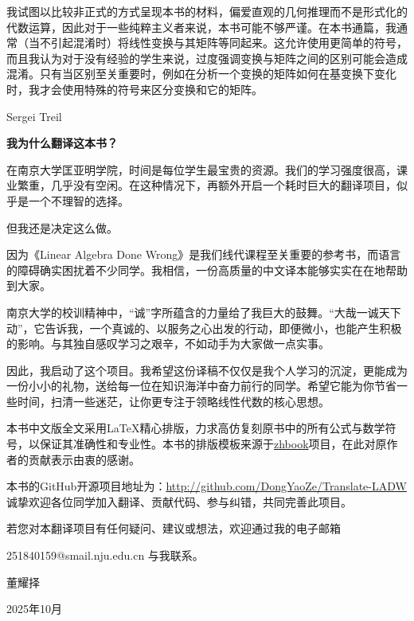 \begin{preface}
我试图以比较非正式的方式呈现本书的材料，偏爱直观的几何推理而不是形式化的代数运算，因此对于一些纯粹主义者来说，本书可能不够严谨。在本书通篇，我通常（当不引起混淆时）将线性变换与其矩阵等同起来。这允许使用更简单的符号，而且我认为对于没有经验的学生来说，过度强调变换与矩阵之间的区别可能会造成混淆。只有当区别至关重要时，例如在分析一个变换的矩阵如何在基变换下变化时，我才会使用特殊的符号来区分变换和它的矩阵。
\vspace{5ex}
\begin{flushright}
Sergei Treil~~~~~~~~~
\end{flushright}





\end{preface}

\begin{preface}[译者的话]

\textbf{我为什么翻译这本书？}

在南京大学匡亚明学院，时间是每位学生最宝贵的资源。我们的学习强度很高，课业繁重，几乎没有空闲。在这种情况下，再额外开启一个耗时巨大的翻译项目，似乎是一个不理智的选择。

但我还是决定这么做。

因为《Linear Algebra Done Wrong》是我们线代课程至关重要的参考书，而语言的障碍确实困扰着不少同学。我相信，一份高质量的中文译本能够实实在在地帮助到大家。

南京大学的校训精神中，“诚”字所蕴含的力量给了我巨大的鼓舞。“大哉一诚天下动”，它告诉我，一个真诚的、以服务之心出发的行动，即便微小，也能产生积极的影响。与其独自感叹学习之艰辛，不如动手为大家做一点实事。

因此，我启动了这个项目。我希望这份译稿不仅仅是我个人学习的沉淀，更能成为一份小小的礼物，送给每一位在知识海洋中奋力前行的同学。希望它能为你节省一些时间，扫清一些迷茫，让你更专注于领略线性代数的核心思想。

\vspace{2ex} 

本书中文版全文采用\LaTeX{}精心排版，力求高仿复刻原书中的所有公式与数学符号，以保证其准确性和专业性。本书的排版模板来源于\href{http://haixing-hu.github.io/xelatex-zh-book/}{zhbook}项目，在此对原作者的贡献表示由衷的感谢。

本书的GitHub开源项目地址为：\url{http://github.com/DongYaoZe/Translate-LADW}
诚挚欢迎各位同学加入翻译、贡献代码、参与纠错，共同完善此项目。

若您对本翻译项目有任何疑问、建议或想法，欢迎通过我的电子邮箱 

251840159@smail.nju.edu.cn 与我联系。

\vspace{5ex}
\begin{flushright}
董耀择~~~~~~~~~

2025年10月~~~~~
\end{flushright}

\end{preface}